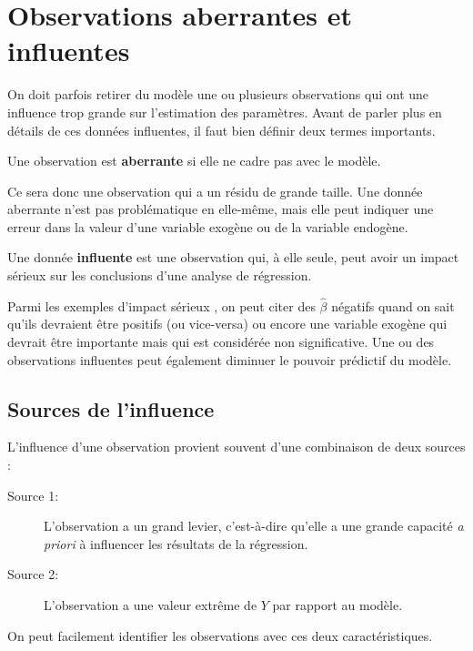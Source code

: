 
\chapter{Observations aberrantes et influentes}
\label{sec:DonneesInfluentes}

\vspace{-0.1in}
On doit parfois retirer du modèle une ou plusieurs observations qui ont une influence trop grande sur l'estimation des paramètres. Avant de parler plus en détails de ces données influentes, il faut bien définir deux termes importants.

\begin{defn}\label{def:aber}
Une observation est \textbf{ aberrante} si elle ne cadre pas avec le modèle.
\end{defn}

\vspace{-0.1in}
Ce sera donc une observation qui a un résidu de grande taille. Une donnée aberrante n'est pas problématique en elle-même, mais elle peut indiquer une erreur dans la valeur d'une variable exogène ou de la variable endogène.

\begin{defn}\label{def:infl}
Une donnée \textbf{influente} est une observation qui, \`a elle seule, peut avoir un impact sérieux sur les conclusions d'une analyse de régression.
\end{defn}

\vspace{-0.1 in}
Parmi les exemples \og d'impact sérieux \fg, on peut citer des $\hat{\beta}$ négatifs quand on sait qu'ils devraient \^etre positifs (ou vice-versa) ou encore une variable exogène qui devrait \^etre importante mais qui est considérée non significative. Une ou des observations influentes peut également diminuer le pouvoir prédictif du modèle.

\section{Sources de l'influence}

L'influence d'une observation provient souvent d'une combinaison de
deux sources :
\begin{description}
\item[Source 1:] L'observation a un grand levier, c'est-à-dire qu'elle a une grande capacité \textit{a priori} à influencer les résultats de la régression.
\item[Source 2:] L'observation a une valeur extrême de $Y$ par rapport au modèle.
\end{description}
On peut facilement identifier les observations avec ces deux caractéristiques.

